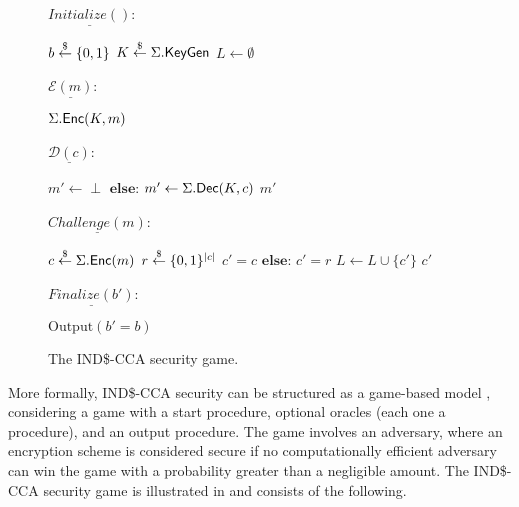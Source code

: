 \begin{figure}
\begin{adjustbox}{margin*=10,frame,center}
	\footnotesize
	\begin{minipage}[t]{0.40\textwidth}
		$\underline{Initialize()}$: 
		\begin{algorithmic}[1]		
			\State $b \overset{\$}{\leftarrow} \{0,1\}$
			\State $K \overset{\$}{\leftarrow} \Sigma.\mathsf{KeyGen}$
			\State $L \leftarrow \emptyset$
			\State \Return	
		\end{algorithmic}
		
		\bigskip{}
		
		$\underline{\mathcal{E}(m)}$:
		\begin{algorithmic}[1]
			\State \Return $\Sigma.\mathsf{Enc}(K,m)$
		\end{algorithmic}
		
		\bigskip{}
					
		$\underline{\mathcal{D}(c)}$:
		\begin{algorithmic}[1]
		\State {}
			\State\hspace{\algorithmicindent} $m' \leftarrow \perp$
		\State $\mathbf{else}$:
			\State\hspace{\algorithmicindent} $m' \leftarrow \Sigma.\mathsf{Dec}(K, c)$
		\State \Return $m'$
		\end{algorithmic}	
	\end{minipage}
	\begin{minipage}[t]{0.40\textwidth}
		$\underline{Challenge(m)}$: 
		\begin{algorithmic}[1]
			\State $c \overset{\$}{\leftarrow} \Sigma.\mathsf{Enc}(m)$
			\State $r \overset{\$}{\leftarrow} \{0,1\}^{|c|}$
			\State {}
			\State\hspace{\algorithmicindent} $c' = c$
		\State $\mathbf{else}$:
			\State\hspace{\algorithmicindent} $c' = r$
			\State $L \leftarrow L \cup \{c'\}$	
			\State \Return $c'$	
		\end{algorithmic}		
		
		\bigskip{}		
				
		$\underline{Finalize(b')}$: 
		\begin{algorithmic}[1]		
			\State $\text{Output} (b' = b)$	
		\end{algorithmic}
	\end{minipage}
\end{adjustbox}
\caption{The IND\$-CCA security game.}
\label{fig:indcca}
\end{figure}

More formally, IND\$-CCA security can be structured as a game-based model \cite{bellarecode}, considering a game with a start procedure, optional oracles (each one a procedure), and an output procedure. The game involves an adversary, where an encryption scheme is considered secure if no computationally efficient adversary can win the game with a probability greater than a negligible amount. The IND\$-CCA security game is illustrated in  and consists of the following.

